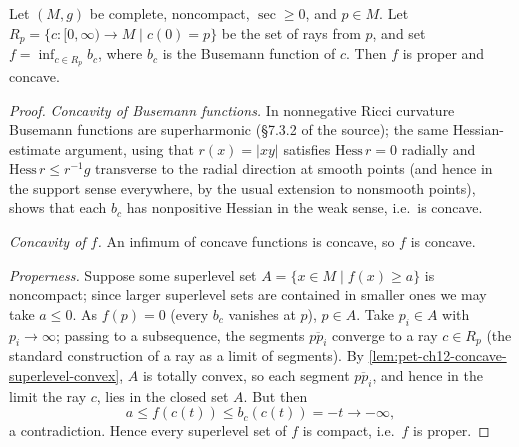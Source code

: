 \begin{lemma}
  \label{lem:pet-ch12-busemann-proper-concave}
  Let $(M,g)$ be complete, noncompact, $\sec\ge0$, and $p\in M$. Let
  $R_p=\{c:[0,\infty)\to M\mid c(0)=p\}$ be the set of rays from $p$, and set
  $f=\inf_{c\in R_p}b_c$, where $b_c$ is the Busemann function of $c$. Then $f$
  is proper and concave.
\end{lemma}
\begin{proof}
  \emph{Concavity of Busemann functions.} In nonnegative Ricci curvature
  Busemann functions are superharmonic (§7.3.2 of the source); the same
  Hessian-estimate argument, using that $r(x)=|xy|$ satisfies
  $\mathrm{Hess}\,r=0$ radially and $\mathrm{Hess}\,r\le r^{-1}g$ transverse to
  the radial direction at smooth points (and hence in the support sense
  everywhere, by the usual extension to nonsmooth points), shows that each
  $b_c$ has nonpositive Hessian in the weak sense, i.e.\ is concave.

  \emph{Concavity of $f$.} An infimum of concave functions is concave, so $f$ is
  concave.

  \emph{Properness.} Suppose some superlevel set
  $A=\{x\in M\mid f(x)\ge a\}$ is noncompact; since larger superlevel sets are
  contained in smaller ones we may take $a\le0$. As $f(p)=0$ (every $b_c$
  vanishes at $p$), $p\in A$. Take $p_i\in A$ with $p_i\to\infty$; passing to a
  subsequence, the segments $\overline{pp_i}$ converge to a ray $c\in R_p$ (the
  standard construction of a ray as a limit of segments). By
  \cref{lem:pet-ch12-concave-superlevel-convex}, $A$ is totally convex, so each
  segment $\overline{pp_i}$, and hence in the limit the ray $c$, lies in the
  closed set $A$. But then
  \[
    a\le f(c(t))\le b_c(c(t))=-t\to-\infty,
  \]
  a contradiction. Hence every superlevel set of $f$ is compact, i.e.\ $f$ is
  proper.
\end{proof}

